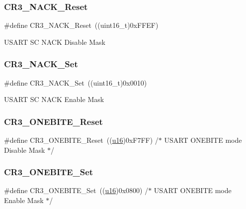 \subsubsection{\texorpdfstring{CR3\_NACK\_Reset}{CR3\_NACK\_Reset}}
{\footnotesize\ttfamily \#define C\+R3\+\_\+\+N\+A\+C\+K\+\_\+\+Reset~((uint16\+\_\+t)0x\+F\+F\+E\+F)}

U\+S\+A\+RT SC N\+A\+CK Disable Mask \mbox{\label{group___u_s_a_r_t___private___defines_ga950cc9f7251709854754add7d9aaca60}} 
\subsubsection{\texorpdfstring{CR3\_NACK\_Set}{CR3\_NACK\_Set}}
{\footnotesize\ttfamily \#define C\+R3\+\_\+\+N\+A\+C\+K\+\_\+\+Set~((uint16\+\_\+t)0x0010)}

U\+S\+A\+RT SC N\+A\+CK Enable Mask \mbox{\label{group___u_s_a_r_t___private___defines_ga55dc289819dde550630df98267bbef52}} 
\subsubsection{\texorpdfstring{CR3\_ONEBITE\_Reset}{CR3\_ONEBITE\_Reset}}
{\footnotesize\ttfamily \#define C\+R3\+\_\+\+O\+N\+E\+B\+I\+T\+E\+\_\+\+Reset~((\mbox{\hyperlink{group___exported__types_gace9d960e74685e2cd84b36132dbbf8aa}{u16}})0x\+F7\+F\+F)  /$\ast$ U\+S\+A\+R\+T O\+N\+E\+B\+I\+T\+E mode Disable Mask $\ast$/}

\mbox{\label{group___u_s_a_r_t___private___defines_gac512024dda541435acfe0b50de925105}} 
\subsubsection{\texorpdfstring{CR3\_ONEBITE\_Set}{CR3\_ONEBITE\_Set}}
{\footnotesize\ttfamily \#define C\+R3\+\_\+\+O\+N\+E\+B\+I\+T\+E\+\_\+\+Set~((\mbox{\hyperlink{group___exported__types_gace9d960e74685e2cd84b36132dbbf8aa}{u16}})0x0800)  /$\ast$ U\+S\+A\+R\+T O\+N\+E\+B\+I\+T\+E mode Enable Mask $\ast$/}

